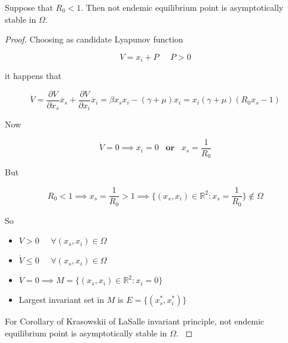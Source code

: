 \begin{theorem}
Suppose that $R_0 < 1$. Then not endemic equilibrium point is asymptotically stable in $\Omega$.
\end{theorem}

\begin{proof}
Choosing as candidate Lyapunov function

\begin{equation}
    \label{eq:lyapunov_r0_minor_1}
    V = x_i + P \;\;\;\;\; P > 0
\end{equation}

it happens that

\begin{equation}
    \label{eq:lyapunov_derivative_1_r0_minor_1}
    \dot{V} = \frac{\partial V}{\partial x_s} \dot{x_s} + \frac{\partial V}{\partial x_i} \dot{x_i} = \beta x_sx_i-\left(\gamma+\mu\right)x_i=x_i\left(\gamma+\mu\right)\left(R_0x_s-1\right)
\end{equation}

Now

\begin{equation}
    \dot{V} = 0 \implies x_i = 0 \;\;\;\textbf{or}\;\;\; x_s = \frac{1}{R_0}
\end{equation}

But

\begin{equation}
    R_0 < 1 \implies x_s = \frac{1}{R_0} > 1 \implies \{(x_s,x_i) \in \mathbb{R}^2: x_s = \frac{1}{R_0}\} \notin \Omega
\end{equation}

So

\begin{itemize}
    \item $V > 0 \;\;\;\;\; \forall \left( x_s, x_i \right) \in \Omega$
    \item $ \dot{V} \leq 0 \;\;\;\;\; \forall \left( x_s, x_i \right) \in \Omega$
    \item $ \dot{V} = 0 \implies M = \{(x_s,x_i) \in \mathbb{R}^2: x_i = 0\}$
    \item Largest invariant set in $M$ is $E = \{(x_s^*,x_i^*)\}$
\end{itemize}

For Corollary of Krasowskii of LaSalle invariant principle, not endemic equilibrium point is asymptotically stable in $\Omega$. \cite[p.128]{bib:khalil}
\end{proof}